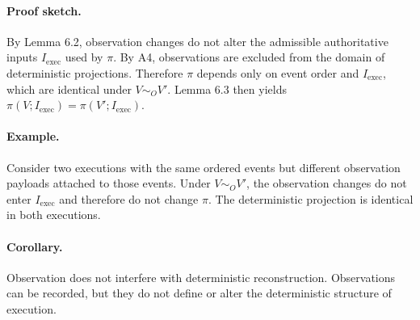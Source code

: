 \paragraph{Proof sketch.}
By Lemma 6.2, observation changes do not alter the admissible authoritative inputs $I_{\text{exec}}$ used by $\pi$. By A4, observations are excluded from the domain of deterministic projections. Therefore $\pi$ depends only on event order and $I_{\text{exec}}$, which are identical under $V \sim_O V'$. Lemma 6.3 then yields $\pi(V; I_{\text{exec}}) = \pi(V'; I_{\text{exec}})$.

\paragraph{Example.}
Consider two executions with the same ordered events but different observation payloads attached to those events. Under $V \sim_O V'$, the observation changes do not enter $I_{\text{exec}}$ and therefore do not change $\pi$. The deterministic projection is identical in both executions.

\paragraph{Corollary.}
Observation does not interfere with deterministic reconstruction. Observations can be recorded, but they do not define or alter the deterministic structure of execution.
